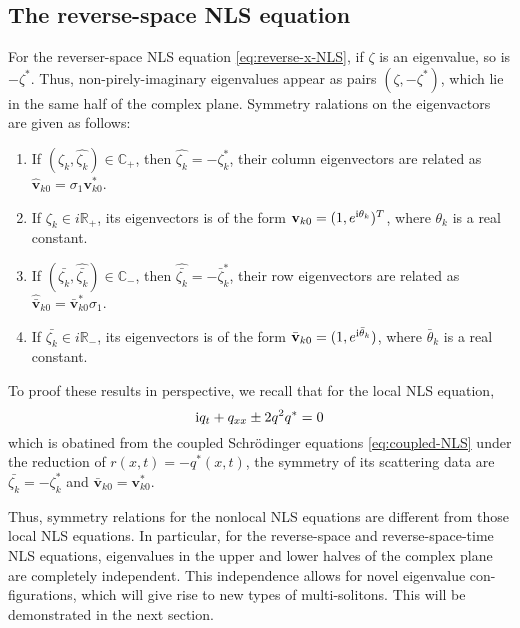 \subsection{The reverse-space NLS equation}
\begin{theorem}
    For the reverser-space NLS equation \eqref{eq:reverse-x-NLS}, if $ \zeta $ is an eigenvalue, so is $ -\zeta^{*} $. Thus, non-pirely-imaginary eigenvalues appear as pairs $(\zeta, -\zeta^{*})$, which lie in the same half of the complex plane. Symmetry ralations on the eigenvactors are given as follows: 
    \begin{enumerate}
        \item If $ (\zeta_{k}, \hat{\zeta_{k}}) \in \mathbb{C_{+}}$, then $\hat{\zeta_{k}} = - \zeta^{*}_{k} $, their column eigenvectors are related as $\hat{\mathbf{v}}_{k0} = \sigma_{1} \mathbf{v}_{k0}^{*}$.
        \item If $ \zeta_{k} \in i\mathbb{R}_{+} $, its eigenvectors is of the form $\mathbf{v}_{k0} = (1, e^{\mathrm{i}\theta_{k}})^{T} $, where $ \theta_{k} $ is a real constant.
        \item If $ (\bar{\zeta_{k}}, \hat{\bar{\zeta_{k}}}) \in \mathbb{C_{-}} $, then $\hat{\bar{\zeta_{k}}} = - \bar{\zeta}^{*}_{k} $, their row eigenvectors are related as $\hat{\bar{\mathbf{v}}}_{k0} = \bar{\mathbf{v}}_{k0}^{*} \sigma_{1}$.
        \item If $ \bar{\zeta_{k}} \in i\mathbb{R}_{-} $, its eigenvectors is of the form $\bar{\mathbf{v}}_{k0} = (1 ,e^{\mathrm{i}\bar{\theta}_{k}})$, where $ \bar{\theta}_{k} $ is a real constant.
    \end{enumerate}
\end{theorem}
To proof these results in perspective, we recall that for the local NLS equation, 
\begin{equation}
    \mathrm{i} q_{t} + q_{xx} \pm 2 q^{2} q^{*} = 0 \label{eq:local-NLS}
\end{equation}
which is obatined from the coupled Schrödinger equations \eqref{eq:coupled-NLS} under the reduction of $ r(x,t) = -q^{*}(x,t) $, the symmetry of its scattering data are $ \bar{\zeta_{k}} = -\zeta^{*}_{k} $ and $\bar{\mathbf{v}}_{k0} = \mathbf{v}_{k0}^{*} $. 

Thus, symmetry relations for the nonlocal NLS equations are different from those local NLS equations.  In particular, for the reverse-space and reverse-space-time NLS equations, eigenvalues in the upper and lower halves of the complex plane are completely independent. This independence allows for novel eigenvalue con-figurations, which will give rise to new types of multi-solitons. This will be demonstrated in the next section. 

